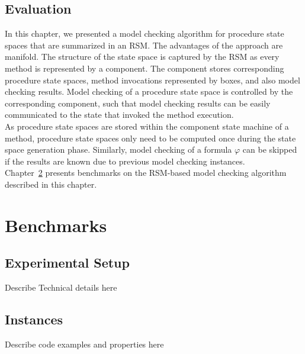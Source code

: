 \documentclass[a4paper, 12pt, twoside]{report}
\begin{document}
	\section{Evaluation}
	
	
	In this chapter, we presented a model checking algorithm for procedure state spaces that are summarized in an RSM. The advantages of the approach are manifold. The structure of the state space is captured by the RSM as every method is represented by a component. The component stores corresponding procedure state spaces, method invocations represented by boxes, and also model checking results. Model checking of a procedure state space is controlled by the corresponding component, such that model checking results can be easily communicated to the state that invoked the method execution. \\
	
	As procedure state spaces are stored within the component state machine of a method, procedure state spaces only need to be computed once during the state space generation phase. Similarly, model checking of a formula $\varphi$ can be skipped if the results are known due to previous model checking instances.\\	
	
	
	Chapter~\ref{chp:benchmarks} presents benchmarks on the RSM-based model checking algorithm described in this chapter.
	
	\chapter{Benchmarks}\label{chp:benchmarks}	
	
	\section{Experimental Setup}
	Describe Technical details here
	
	\section{Instances}
	Describe code examples and properties here
	
\end{document}
